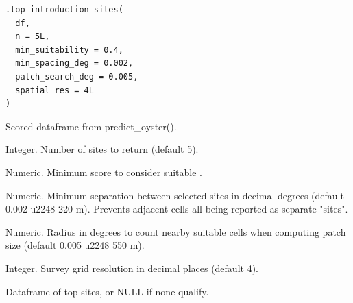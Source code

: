 \documentclass[a4paper]{book}
\begin{document}
%
\begin{Usage}
\begin{verbatim}
.top_introduction_sites(
  df,
  n = 5L,
  min_suitability = 0.4,
  min_spacing_deg = 0.002,
  patch_search_deg = 0.005,
  spatial_res = 4L
)
\end{verbatim}
\end{Usage}
%
\begin{Arguments}
\begin{ldescription}
\item[\code{df}] Scored dataframe from predict\_oyster().

\item[\code{n}] Integer. Number of sites to return (default 5).

\item[\code{min\_suitability}] Numeric. Minimum score to consider suitable .

\item[\code{min\_spacing\_deg}] Numeric. Minimum separation between selected sites
in decimal degrees (default 0.002 \bsl{}u2248 220 m). Prevents adjacent cells all
being reported as separate "sites".

\item[\code{patch\_search\_deg}] Numeric. Radius in degrees to count nearby suitable
cells when computing patch size (default 0.005 \bsl{}u2248 550 m).

\item[\code{spatial\_res}] Integer. Survey grid resolution in decimal places (default 4).
\end{ldescription}
\end{Arguments}
%
\begin{Value}
Dataframe of top sites, or NULL if none qualify.
\end{Value}
%
\end{document}
